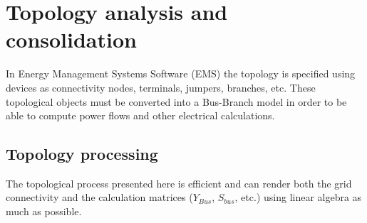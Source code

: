 \documentclass[nols,a4paper,twoside,symmetric,notoc,fleqn]{tufte-book}
\begin{document}
%






\chapter{Topology analysis and consolidation} \label{topology}

In Energy Management Systems Software (EMS) the topology is specified using devices as connectivity nodes, terminals, jumpers, branches, etc. These topological objects must be converted into a Bus-Branch model in order to be able to compute power flows and other electrical calculations.


\section{Topology processing}
\label{TopologyProcessing}
 The topological process presented here is efficient and can render both the grid connectivity and the calculation matrices ($Y_{Bus}$, $S_{bus}$, etc.) using linear algebra as much as possible.
\end{document}
